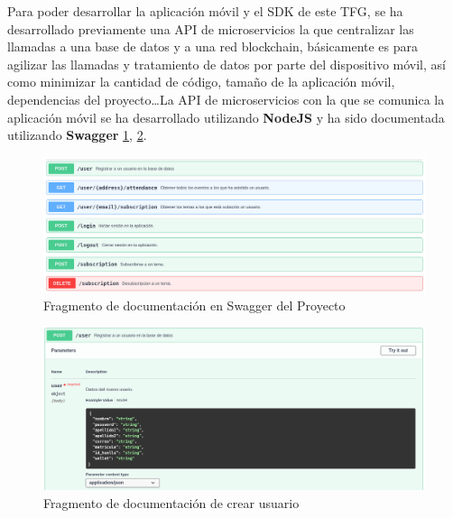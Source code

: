 Para poder desarrollar la aplicación móvil y el SDK de este TFG, se ha desarrollado previamente una API de microservicios la que centralizar las llamadas a una base de datos y a una red blockchain, básicamente es para agilizar las llamadas y tratamiento de datos por parte del dispositivo móvil, así como minimizar la cantidad de código, tamaño de la aplicación móvil, dependencias del proyecto\dots La API de microservicios con la que se comunica la aplicación móvil se ha desarrollado utilizando \textbf{NodeJS} y ha sido documentada utilizando \textbf{Swagger} \ref{fig:swaggerQuerys}, \ref{fig:swaggerUsuario}. \\

\begin{figure}[h!]
  \centering
  \includegraphics[width=1\linewidth]{figs/Desarrollo/Swagger}
  \caption[Swagger]{Fragmento de documentación en Swagger del Proyecto}
  \label{fig:swaggerQuerys}
\end{figure}

\begin{figure}[h!]
  \centering
  \includegraphics[width=1\linewidth]{figs/Desarrollo/SwaggerUsuario}
  \caption[Swagger Usuario]{Fragmento de documentación de crear usuario}
  \label{fig:swaggerUsuario}
\end{figure}


